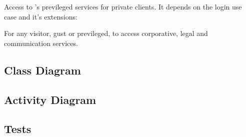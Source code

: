 %
\begin{use-case}
  \label{uc:enter-user-area}
  Access to \lifetime's previleged services for private clients. It
  depends on the login use case and it's extensions:
  \begin{sub-use-case}[Login]
  \end{sub-use-case}
  \begin{sub-use-case}
  \end{sub-use-case}
  \begin{sub-use-case}
  \end{sub-use-case}
  \begin{sub-use-case}
  \end{sub-use-case}
\end{use-case}
%
\begin{use-case}
  \label{uc:view-contact}
  For any visitor, gust or previleged, to access corporative, legal
  and communication services.
  \begin{sub-use-case}[Kontakt]
  \end{sub-use-case}
  \begin{sub-use-case}[Impressum]
  \end{sub-use-case}
\end{use-case}
%

\subsection{Class Diagram}
\label{sec:registation-class-diagram}
%



\subsection{Activity Diagram}
\label{sec:registation-activity-diagram}

%
\subsection{Tests}
\label{sec:tests}

